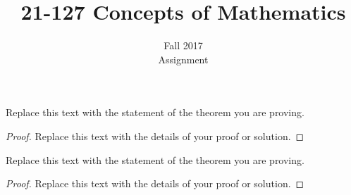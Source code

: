 \documentclass{article}
\newenvironment{problem}[2][Problem]{\begin{trivlist}
\item[\hskip \labelsep {\bfseries #1}\hskip \labelsep {\bfseries #2.}]}{\end{trivlist}}
\begin{document}

\title{21-127 Concepts of Mathematics} %
\author{Fall 2017\\Assignment } %

\maketitle

%
%

\begin{problem}{1}
Replace this text with the statement of the theorem you are proving.
\end{problem}

\begin{proof}
Replace this text with the details of your proof or solution.
\end{proof}


\vspace{0.25in} %

\begin{problem}{2}
Replace this text with the statement of the theorem you are proving.
\end{problem}

\begin{proof}
Replace this text with the details of your proof or solution.
\end{proof}

\end{document}
